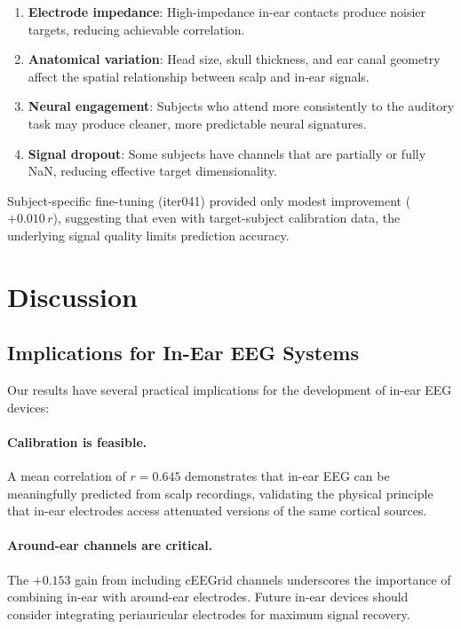 \documentclass[conference]{IEEEtran}
\begin{document}
\begin{enumerate}
    \item \textbf{Electrode impedance}: High-impedance in-ear contacts produce noisier targets, reducing achievable correlation.
    \item \textbf{Anatomical variation}: Head size, skull thickness, and ear canal geometry affect the spatial relationship between scalp and in-ear signals.
    \item \textbf{Neural engagement}: Subjects who attend more consistently to the auditory task may produce cleaner, more predictable neural signatures.
    \item \textbf{Signal dropout}: Some subjects have channels that are partially or fully NaN, reducing effective target dimensionality.
\end{enumerate}

Subject-specific fine-tuning (iter041) provided only modest improvement ($+0.010\,r$), suggesting that even with target-subject calibration data, the underlying signal quality limits prediction accuracy.

\section{Discussion}
\label{sec:discussion}

\subsection{Implications for In-Ear EEG Systems}

Our results have several practical implications for the development of in-ear EEG devices:

\paragraph{Calibration is feasible.} A mean correlation of $r = 0.645$ demonstrates that in-ear EEG can be meaningfully predicted from scalp recordings, validating the physical principle that in-ear electrodes access attenuated versions of the same cortical sources.

\paragraph{Around-ear channels are critical.} The $+0.153$ gain from including cEEGrid channels underscores the importance of combining in-ear with around-ear electrodes. Future in-ear devices should consider integrating periauricular electrodes for maximum signal recovery.
\end{document}
